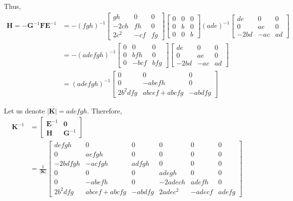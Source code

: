 \documentclass{article}
\begin{document}
Thus,
\begin{equation}
\begin{aligned} 
   \mathbf{H} = -\mathbf{G}^{-1} \mathbf{F} \mathbf{E}^{-1} &= - 
 (fgh)^{-1} \begin{bmatrix}
        gh  &0  &0 \\
        -2ch  &fh   &0\\
        2c^2 &-cf &fg
    \end{bmatrix}
\begin{bmatrix}
    0 &0 &0 \\
    0 &b &0 \\
    0 &0 &b 
\end{bmatrix}
(ade)^{-1}
    \begin{bmatrix}
        de &0 &0 \\
        0 &ae &0 \\
        -2bd &-ac & ad
    \end{bmatrix} \\
&=-(adefgh)^{-1}
\begin{bmatrix}
0 &0 &0 \\
0 &bfh &0 \\
0 &-bcf & bfg
\end{bmatrix} 
\begin{bmatrix}
        de &0 &0 \\
        0 &ae &0 \\
        -2bd &-ac & ad
    \end{bmatrix} \\
&=(adefgh)^{-1}
\begin{bmatrix}
0 & 0 & 0 \\
0 & -abefh &0 \\
2b^2 dfg & abcef+abcfg &-abdfg
\end{bmatrix}
\end{aligned}
\end{equation}



Let us denote $|\mathbf{K}|=adefgh$. Therefore,
\begin{equation}
\begin{aligned}
\mathbf{K}^{-1}& =
\begin{bmatrix}
        \mathbf{E}^{-1} & \mathbf{0} \\
        \mathbf{H}  & \mathbf{G}^{-1}
\end{bmatrix} \\
& =
\frac{1}{|\mathbf{K}|}
\begin{bmatrix}
defgh &0 &0 &0 &0 &0 \\
0 &aefgh &0 &0 &0 &0 \\
-2bdfgh &-acfgh & adfgh &0 &0 &0 \\
0 & 0 & 0 &adegh  &0  &0 \\
0 & -abefh &0 &-2adech  &adefh   &0\\
2b^2 dfg & abcef+abcfg &-abdfg &2adec^2 &-adecf &adefg
\end{bmatrix}
\end{aligned}
\end{equation}
\end{document}
